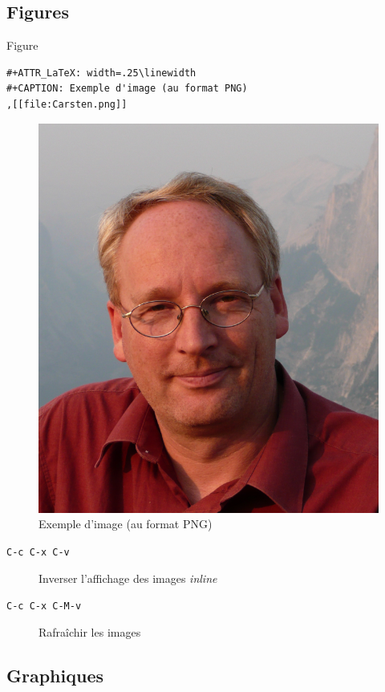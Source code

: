 \documentclass[presentation,t,hideothersubsections]{beamer}
\begin{document}
\subsection{Figures}
\label{sec-3-4}

\begin{frame}[fragile,label=sec-3-4-1]{Figure}
 \lstset{language=org,numbers=none}
\begin{lstlisting}
#+ATTR_LaTeX: width=.25\linewidth
#+CAPTION: Exemple d'image (au format PNG)
,[[file:Carsten.png]]
\end{lstlisting}

\begin{figure}[!htbp]
\centering
\includegraphics[width=.9\linewidth]{Carsten.png}
\caption{Exemple d'image (au format PNG)}
\end{figure}

\begin{description}
\item[\texttt{C-c C-x C-v}] Inverser l'affichage des images \emph{inline}
\item[\texttt{C-c C-x C-M-v}] Rafraîchir les images
\end{description}
\end{frame}
\subsection{Graphiques}
\label{sec-3-5}
\end{document}
